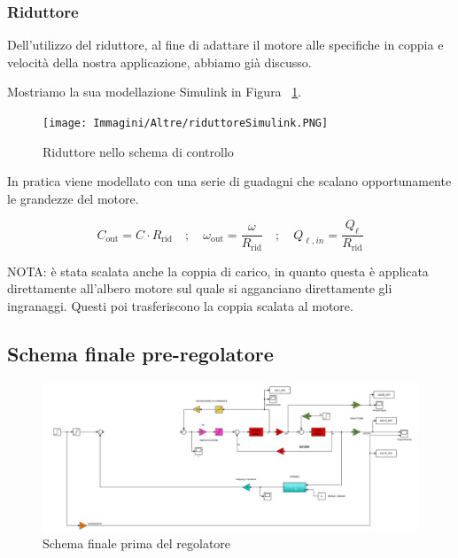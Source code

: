 \documentclass[a4paper,12pt]{article}
\begin{document}
\subsubsection{Riduttore}

Dell'utilizzo del riduttore, al fine di adattare il motore alle specifiche in coppia e velocità della nostra applicazione, abbiamo già discusso.

Mostriamo la sua modellazione Simulink in Figura ~\ref{fig:simulink_controllo_riduttore}.

\vspace{0.5cm}

\begin{figure}[h!]
\centering
    \texttt{[image: Immagini/Altre/riduttoreSimulink.PNG]}
    \caption{Riduttore nello schema di controllo}
    \label{fig:simulink_controllo_riduttore}
\end{figure}

\vspace{0.5cm}

In pratica viene modellato con una serie di guadagni che scalano opportunamente le grandezze del motore.

\[
C_{\text{out}} = C \cdot R_{\text{rid}} \quad ; \quad
\omega_{\text{out}} = \frac{\omega}{R_{\text{rid}}} \quad ; \quad
Q_{\ell,in} = \frac{Q_{\ell}}{R_{\text{rid}}}
\]

\vspace{0.5cm}
NOTA: è stata scalata anche la coppia di carico, in quanto questa è applicata direttamente all'albero motore sul quale si agganciano direttamente gli ingranaggi. Questi poi trasferiscono la coppia scalata al motore.


\subsection{Schema finale pre-regolatore}

\begin{figure}[h!]
\centering
    \includegraphics[scale=0.5]{Immagini/Altre/preRegolatoreSimulink.PNG}
    \caption{Schema finale prima del regolatore}
    \label{fig:simulink_pre_regolatore}
\end{figure}
\end{document}
